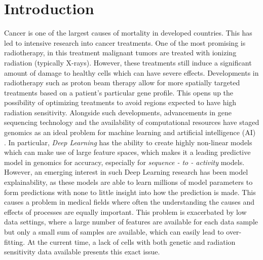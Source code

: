 \documentclass[NOTE, disdraft=true, UKenglish]{\DISCDTLATEXPATH UCLCDTDISdoc}
\begin{document}
\maketitle

\tableofcontents

\clearpage


\newpage

\newpage
\section{Introduction}
\label{sec:introduction}
Cancer is one of the largest causes of mortality in developed countries. This has led to intensive research into cancer treatments. One of the most promising is radiotherapy, in this treatment malignant tumors are treated with ionizing radiation (typically X-rays). However, these treatments still induce a significant amount of damage to healthy cells which can have severe effects. Developments in radiotherapy such as proton beam therapy \cite{proton_beam} allow for more spatially targeted treatments based on a patient's particular gene profile. This opens up the possibility of optimizing treatments to avoid regions expected to have high radiation sensitivity. Alongside such developments, advancements in gene sequencing technology and the availability of computational resources have staged genomics as an ideal problem for machine learning and artificial intelligence (AI) \cite{machine learning genomics}. In particular, \textit{Deep Learning} has the ability to create highly non-linear models which can make use of large feature spaces, which makes it a leading predictive model in genomics for accuracy, especially for \textit{sequence - to - activity} models. However, an emerging interest in such Deep Learning research has been model explainability, as these models are able to learn millions of model parameters to form predictions with none to little insight into how the prediction is made. This causes a problem in medical fields where often the understanding the causes and effects of processes are equally important. This problem is exacerbated by low data settings, where a large number of features are available for each data sample but only a small sum of samples are available, which can easily lead to over-fitting. At the current time, a lack of cells with both genetic and radiation sensitivity data available presents this exact issue. 
\end{document}
